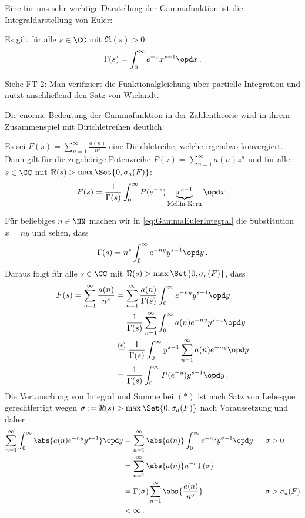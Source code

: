 Eine für uns sehr wichtige Darstellung der Gammafunktion ist die Integraldarstellung von Euler:

\begin{satz}
Es gilt für alle $s \in \CC$ mit $\Re (s) > 0$:
\begin{equation}\label{eq:GammaEulerIntegral}
	\Gamma(s) = \int_0^\infty e^{-x} x^{s-1} \opd x
	\,.
\end{equation}
\end{satz}

\begin{bewe}
Siehe FT 2: Man verifiziert die Funktionalgleichung über partielle Integration und nutzt anschließend den Satz von Wielandt. 
\end{bewe}

Die enorme Bedeutung der Gammafunktion in der Zahlentheorie wird in ihrem Zusammenspiel mit Dirichletreihen deutlich:

\begin{satz}\label{Mellin-Trafo}
Es sei $F(s) = \sum_{n=1}^\infty \frac {a(n)}{n^s}$ eine Dirichletreihe, welche irgendwo konvergiert. Dann gilt für die zugehörige Potenzreihe $P(z) = \sum_{n=1}^\infty a(n) z^n$ und für alle $s \in \CC$ mit $\Re (s) > \max \Set {0, \sigma_a(F)}$:
\[
	F(s) = \frac 1{\Gamma(s)} \int_0^\infty P(e^{-x}) \underbrace{x^{s-1}}_{\text{Mellin-Kern}} \opd x
	\,.
\]
\end{satz}

\begin{bewe}
Für beliebiges $n \in \NN$ machen wir in \eqref{eq:GammaEulerIntegral} die Substitution $x = ny$ und sehen, dass
\[
	\Gamma(s) = n^s \int_0^\infty e^{-ny} y^{s-1} \opd y
	\,.
\]
Daraus folgt für alle $s \in \CC$ mit $\Re (s) > \max \Set {0, \sigma_a(F)}$, dass
\begin{align*}
	F(s) = \sum_{n=1}^\infty \frac {a(n)}{n^s}
	&= \sum_{n=1}^\infty \frac {a(n)}{\Gamma(s)} \int_0^\infty e^{-ny} y^{s-1} \opd y \\
	&= \frac 1{\Gamma(s)} \sum_{n=1}^\infty \int_0^\infty a(n) e^{-ny} y^{s-1} \opd y \\
	&\overset {(\ast)}= \frac 1{\Gamma(s)} \int_0^\infty y^{s-1} \sum_{n=1}^\infty a(n) e^{-ny} \opd y \\
	&= \frac 1{\Gamma(s)} \int_0^\infty P(e^{-y}) y^{s-1} \opd y
	\,.
\end{align*}
Die Vertauschung von Integral und Summe bei $(\ast)$ ist nach Satz von Lebesgue gerechtfertigt wegen $\sigma := \Re (s) > \max \Set {0, \sigma_a(F)}$ nach Voraussetzung und daher
\begin{align*}
	\sum_{n=1}^\infty \int_0^\infty \abs{a(n) e^{-ny} y^{s-1} } \opd y
	&= \sum_{n=1}^\infty \abs{a(n)} \int_0^\infty e^{-ny} y^{\sigma-1} \opd y && \big| \; \sigma > 0 \\
	&= \sum_{n=1}^\infty \abs{a(n)} n^{-\sigma} \Gamma(\sigma) \\
	&= \Gamma(\sigma) \sum_{n=1}^\infty \abs{\frac {a(n)}{n^{\sigma}}} && \big| \; \sigma > \sigma_a(F) \\
	&< \infty
	\,.
\end{align*}
\end{bewe}


